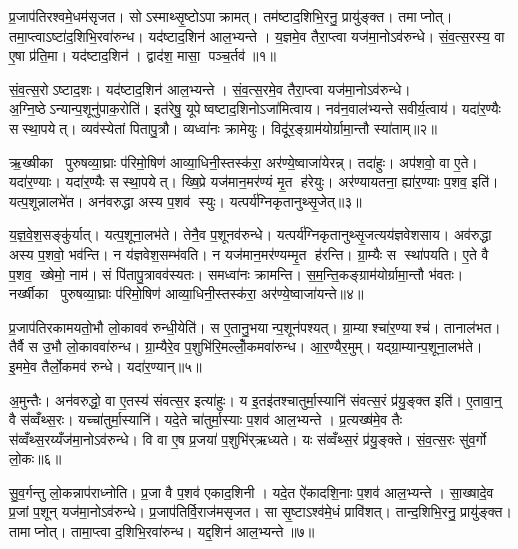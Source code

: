 \clearpage
{}
\setcounter{anuvakam}{0}
प्र॒जाप॑तिरश्वमे॒धम॑सृजत। सोऽस्माथ्सृ॒ष्टोऽपाक्रामत्। तम॑ष्टाद॒शिभि॒रनु॒ प्रायु॑ङ्क्त। तमाप्नोत्। तमा॒प्त्वाऽष्टा॑द॒शिभि॒रवा॑रुन्ध। यद॑ष्टाद॒शिन॑ आल॒भ्यन्ते। य॒ज्ञमे॒व तैरा॒प्त्वा यज॑मा॒नोऽव॑रुन्धे। सं॒व॒त्स॒रस्य॒ वा ए॒षा प्र॑ति॒मा। यद॑ष्टाद॒शिन॑। द्वाद॑श॒ मासा॒ पञ्च॒र्तव॑॥१॥

सं॒व॒त्स॒रोऽष्टाद॒शः। यद॑ष्टाद॒शिन॑ आल॒भ्यन्ते। सं॒व॒त्स॒रमे॒व तैरा॒प्त्वा यज॑मा॒नोऽव॑रुन्धे। अ॒ग्नि॒ष्ठेऽन्यान्प॒शूनु॑पाक॒रोति॑। इत॑रेषु॒ यूपेष्वष्टाद॒शिनोऽजा॑मित्वाय। नव॑न॒वाल॑भ्यन्ते सवीर्य॒त्वाय॑। यदा॑र॒ण्यैः सस्था॒पयेत्। व्यव॑स्येतां पितापु॒त्रौ। व्यध्वा॑नः क्रामेयुः। विदू॑र॒ङ्ग्राम॑योर्ग्रामा॒न्तौ स्या॑ताम्॥२॥

ऋ॒ख्षीका पुरुषव्या॒घ्राः प॑रिमो॒षिण॑ आव्या॒धिनी॒स्तस्क॑रा॒ अर॑ण्ये॒ष्वाजा॑येरन्न्। तदा॑हुः। अप॑शवो॒ वा ए॒ते। यदा॑र॒ण्याः। यदा॑र॒ण्यैः सस्था॒पयेत्। ख्षि॒प्रे यज॑मान॒मर॑ण्यं मृ॒त ह॑रेयुः। अर॑ण्यायतना॒ ह्या॑र॒ण्याः प॒शव॒ इति॑। यत्प॒शून्नालभे॑त। अन॑वरुद्धा अस्य प॒शव॑ स्युः। यत्पर्य॑ग्निकृतानुथ्सृ॒जेत्॥३॥

य॒ज्ञ॒वे॒श॒सङ्कु॑र्यात्। यत्प॒शूना॒लभ॑ते। तेनै॒व प॒शूनव॑रुन्धे। यत्पर्य॑ग्निकृतानुथ्सृ॒जत्यय॑ज्ञवेशसाय। अव॑रुद्धा अस्य प॒शवो॒ भव॑न्ति। न य॑ज्ञवेश॒सम्भ॑वति। न यज॑मान॒मर॑ण्यम्मृ॒त ह॑रन्ति। ग्रा॒म्यैः स स्था॑पयति। ए॒ते वै प॒शव॒ ख्षेमो॒ नाम॑। सं पि॑तापु॒त्रावव॑स्यतः। समध्वा॑नः क्रामन्ति। स॒म॒न्ति॒कङ्ग्राम॑योर्ग्रामा॒न्तौ भ॑वतः। नर्ख्षीका पुरुषव्या॒घ्राः प॑रिमो॒षिण॑ आव्या॒धिनी॒स्तस्क॑रा॒ अर॑ण्ये॒ष्वाजा॑यन्ते॥४॥\anuvakamend[ऋ॒तव॑ स्यातामुथ्सृ॒जेथ्स्य॑त॒स्त्रीणि॑ च]

प्र॒जाप॑तिरकामयतो॒भौ लो॒कावव॑ रुन्धी॒येति॑। स ए॒तानु॒भयान्प॒शून॑पश्यत्। ग्रा॒म्याश्चा॑र॒ण्याश्च॑। तानाल॑भत। तैर्वै स उ॒भौ लो॒काववा॑रुन्ध। ग्रा॒म्यैरे॒व प॒शुभि॑रि॒मल्लोँ॒कमवा॑रुन्ध। आ॒र॒ण्यैर॒मुम्। यद्ग्रा॒म्यान्प॒शूना॒लभ॑ते। इ॒ममे॒व तैर्लो॒कमव॑ रुन्धे। यदा॑र॒ण्यान्॥५॥

अ॒मुन्तैः। अन॑वरुद्धो॒ वा ए॒तस्य॑ संवत्स॒र इत्या॑हुः। य इ॒तइ॑तश्चातुर्मा॒स्यानि॑ संवत्स॒रं प्र॑यु॒ङ्क्त इति॑। ए॒तावा॒न्॒ वै स॑व्वँथ्स॒रः। यच्चा॑तुर्मा॒स्यानि॑। यदे॒ते चा॑तुर्मा॒स्याः प॒शव॑ आल॒भ्यन्ते। प्र॒त्यख्ष॑मे॒व तैः स॑व्वँथ्स॒रय्यँज॑मा॒नोऽव॑रुन्धे। वि वा ए॒ष प्र॒जया॑ प॒शुभि॑र्‌ऋध्यते। यः स॑व्वँथ्स॒रं प्र॑यु॒ङ्क्ते। सं॒व॒त्स॒रः सु॑व॒र्गो लो॒कः॥६॥

सु॒व॒र्गन्तु लो॒कन्नाप॑राध्नोति। प्र॒जा वै प॒शव॑ एकाद॒शिनी। यदे॒त ऐ॑कादशि॒नाः प॒शव॑ आल॒भ्यन्ते। सा॒ख्षादे॒व प्र॒जां प॒शून् यज॑मा॒नोऽव॑रुन्धे। प्र॒जाप॑तिर्वि॒राज॑मसृजत। सा सृ॒ष्टाऽश्व॑मे॒धं प्रावि॑शत्। तान्द॒शिभि॒रनु॒ प्रायु॑ङ्क्त। तामाप्नोत्। तामा॒प्त्वा द॒शिभि॒रवा॑रुन्ध। यद्द॒शिन॑ आल॒भ्यन्ते॥७॥

